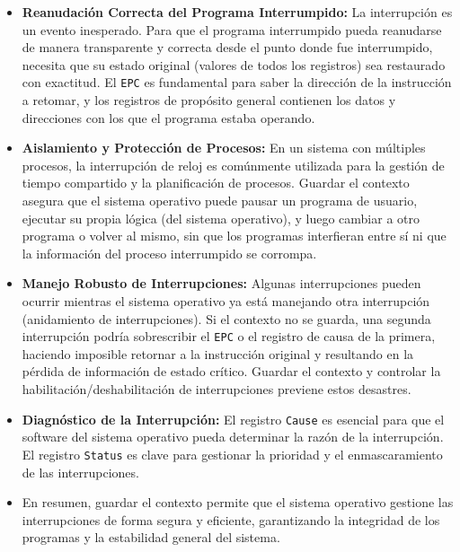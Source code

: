 \documentclass{article}
\begin{document}
\begin{itemize}
    \item \textbf{Reanudación Correcta del Programa Interrumpido:} La interrupción es un evento inesperado. Para que el programa interrumpido pueda reanudarse de manera transparente y correcta desde el punto donde fue interrumpido, necesita que su estado original (valores de todos los registros) sea restaurado con exactitud. El \texttt{EPC} es fundamental para saber la dirección de la instrucción a retomar, y los registros de propósito general contienen los datos y direcciones con los que el programa estaba operando.
    
    \item \textbf{Aislamiento y Protección de Procesos:} En un sistema con múltiples procesos, la interrupción de reloj es comúnmente utilizada para la gestión de tiempo compartido y la planificación de procesos. Guardar el contexto asegura que el sistema operativo puede pausar un programa de usuario, ejecutar su propia lógica (del sistema operativo), y luego cambiar a otro programa o volver al mismo, sin que los programas interfieran entre sí ni que la información del proceso interrumpido se corrompa.
    
    \item \textbf{Manejo Robusto de Interrupciones:} Algunas interrupciones pueden ocurrir mientras el sistema operativo ya está manejando otra interrupción (anidamiento de interrupciones). Si el contexto no se guarda, una segunda interrupción podría sobrescribir el \texttt{EPC} o el registro de causa de la primera, haciendo imposible retornar a la instrucción original y resultando en la pérdida de información de estado crítico. Guardar el contexto y controlar la habilitación/deshabilitación de interrupciones previene estos desastres.
    
    \item \textbf{Diagnóstico de la Interrupción:} El registro \texttt{Cause} es esencial para que el software del sistema operativo pueda determinar la razón de la interrupción. El registro \texttt{Status} es clave para gestionar la prioridad y el enmascaramiento de las interrupciones.
    
    \item En resumen, guardar el contexto permite que el sistema operativo gestione las interrupciones de forma segura y eficiente, garantizando la integridad de los programas y la estabilidad general del sistema.
\end{itemize}
\end{document}
